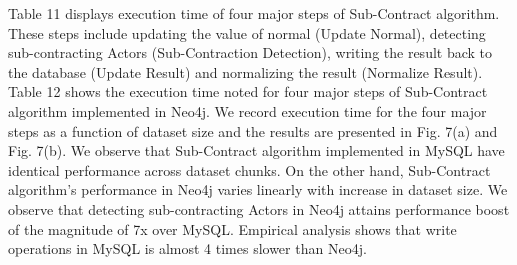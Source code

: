 \documentclass[11pt]{article}
\begin{document}
{{\par{Table 11 displays execution time of four major steps of Sub-Contract algorithm. These steps include updating the value of normal (Update Normal), detecting sub-contracting Actors (Sub-Contraction Detection), writing the result back to the database (Update Result) and normalizing the result (Normalize Result). Table 12 shows the execution time noted for four major steps of Sub-Contract algorithm implemented in Neo4j. We record execution time for the four major steps as a function of dataset size and the results are presented in Fig. 7(a) and Fig. 7(b). We observe that Sub-Contract algorithm implemented in MySQL have identical performance across dataset chunks. On the other hand, Sub-Contract algorithm's performance in Neo4j varies linearly with increase in dataset size. We observe that detecting sub-contracting Actors in Neo4j attains performance boost of the magnitude of 7x over MySQL. Empirical analysis shows that write operations in MySQL is almost 4 times slower than Neo4j.}


}}
\end{document}
